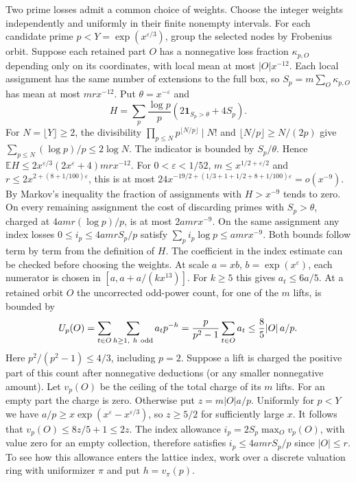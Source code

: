 \documentclass[11pt]{amsart}
\theoremstyle{definition}
\theoremstyle{remark}
\begin{document}
Two prime losses admit a common choice of weights. Choose the integer
weights independently and uniformly in their finite nonempty intervals.
For each candidate prime $p<Y=\exp(x^{\varepsilon/3})$, group the
selected nodes by Frobenius orbit. Suppose each retained part $O$ has
a nonnegative loss fraction $\kappa_{p,O}$ depending only on its
coordinates, with local mean at most $|O|x^{-12}$. Each local
assignment has the same number of extensions to the full box, so
$S_p=m\sum_O\kappa_{p,O}$ has mean at most $mr x^{-12}$.
Put $\theta=x^{-\varepsilon}$ and
\[
 H=\sum_p\frac{\log p}{p}
       (2\mathbf{1}_{S_p>\theta}+4S_p).
\]
For $N=\lfloor Y\rfloor\ge2$, the divisibility
$\prod_{p\le N}p^{\lfloor N/p\rfloor}\mid N!$ and
$\lfloor N/p\rfloor\ge N/(2p)$ give
$\sum_{p\le N}(\log p)/p\le 2\log N$.
The indicator is bounded by $S_p/\theta$. Hence
$\mathbb E H\le 2x^{\varepsilon/3}(2x^\varepsilon+4)mr x^{-12}$.
For $0<\varepsilon<1/52$, $m\le x^{1/2+\varepsilon/2}$ and
$r\le 2x^{2+(8+1/100)\varepsilon}$, this is at most
$24x^{-19/2+(1/3+1+1/2+8+1/100)\varepsilon}=o(x^{-9})$.
By Markov's inequality the fraction of assignments with $H>x^{-9}$
tends to zero. On every remaining assignment the cost of discarding
primes with $S_p>\theta$, charged at $4amr(\log p)/p$, is at most
$2amr x^{-9}$. On the same assignment any index losses
$0\le i_p\le 4amrS_p/p$ satisfy $\sum_p i_p\log p\le amr x^{-9}$.
Both bounds follow term by term from the definition of $H$.
The coefficient in the index estimate can be checked before choosing
the weights. At scale $a=xb$, $b=\exp(x^\varepsilon)$, each
numerator is chosen in $[a,a+a/(kx^{13})]$. For $k\ge5$ this gives
$a_t\le6a/5$. At a retained orbit $O$ the uncorrected odd-power
count, for one of the $m$ lifts, is bounded by
\[
 U_p(O)=\sum_{t\in O}\sum_{h\ge1,\ h\ {\rm odd}}a_t p^{-h}
       =\frac{p}{p^2-1}\sum_{t\in O}a_t
       \le\frac{8}{5}|O|\,a/p .
\]
Here $p^2/(p^2-1)\le4/3$, including $p=2$. Suppose a lift is
charged the positive part of this count after nonnegative deductions
(or any smaller nonnegative amount). Let $v_p(O)$ be the ceiling
of the total charge of its $m$ lifts. For an empty part the charge
is zero. Otherwise put $z=m|O|a/p$. Uniformly for $p<Y$ we have
$a/p\ge x\exp(x^\varepsilon-x^{\varepsilon/3})$, so $z\ge5/2$
for sufficiently large $x$. It follows that
$v_p(O)\le 8z/5+1\le2z$. The index allowance
$i_p=2S_p\max_O v_p(O)$, with value zero for an empty collection,
therefore satisfies $i_p\le4amrS_p/p$ since $|O|\le r$.
To see how this allowance enters the lattice index, work over a
discrete valuation ring with uniformizer $\pi$ and put $h=v_\pi(p)$.
\end{document}
